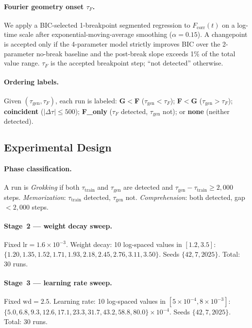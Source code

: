 \documentclass{article}
\newcommand{\taug}{\tau_{\mathrm{gen}}}
\newcommand{\tauf}{\tau_{F}}
\newcommand{\Dtau}{\Delta\tau}
\newcommand{\fcorr}{F_{\mathrm{corr}}}
\begin{document}
\paragraph{Fourier geometry onset $\tauf$.}
We apply a BIC-selected 1-breakpoint segmented regression to
$\fcorr(t)$ on a log-time scale after exponential-moving-average
smoothing ($\alpha{=}0.15$).
A changepoint is accepted only if the 4-parameter model strictly
improves BIC over the 2-parameter no-break baseline and the
post-break slope exceeds 1\% of the total value range.
$\tauf$ is the accepted breakpoint step; ``not detected'' otherwise.

\paragraph{Ordering labels.}
Given $(\taug,\tauf)$, each run is labeled:
\textbf{G$<$F} ($\taug<\tauf$);
\textbf{F$<$G} ($\taug>\tauf$);
\textbf{coincident} ($|\Dtau|\leq500$);
\textbf{F\_only} ($\tauf$ detected, $\taug$ not);
or \textbf{none} (neither detected).

\subsection{Experimental Design}

\paragraph{Phase classification.}
A run is \textit{Grokking} if both $\tau_{\mathrm{train}}$ and
$\taug$ are detected and $\taug-\tau_{\mathrm{train}}\geq2{,}000$
steps. \textit{Memorization}: $\tau_{\mathrm{train}}$ detected,
$\taug$ not. \textit{Comprehension}: both detected,
gap $<2{,}000$ steps.

\paragraph{Stage~2 — weight decay sweep.}
Fixed $\mathrm{lr}{=}1.6\times10^{-3}$.
Weight decay: 10 log-spaced values in $[1.2, 3.5]$:
$\{1.20, 1.35, 1.52, 1.71, 1.93, 2.18, 2.45, 2.76, 3.11, 3.50\}$.
Seeds $\{42,7,2025\}$. Total: 30 runs.

\paragraph{Stage~3 — learning rate sweep.}
Fixed $\mathrm{wd}{=}2.5$.
Learning rate: 10 log-spaced values in $[5\times10^{-4},8\times10^{-3}]$:
$\{5.0, 6.8, 9.3, 12.6, 17.1, 23.3, 31.7, 43.2, 58.8, 80.0\}\times10^{-4}$.
Seeds $\{42,7,2025\}$. Total: 30 runs.
\end{document}
